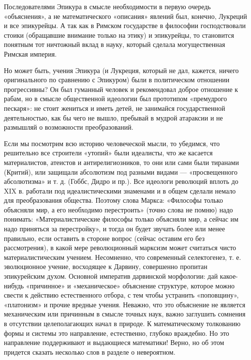 Последователями Эпикура в смысле необходимости в первую очередь «объяснения», а
не математического «описания» явлений был, конечно, Лукреций и все эпикурейцы.
А так как в Римском государстве в философии господствовали стоики (обращавшие
внимание только на этику) и эпикурейцы, то становится понятным тот ничтожный
вклад в науку, который сделала могущественная Римская империя.

Но может быть, учения Эпикура (и Лукреция, который не дал, кажется, ничего
оригинального по сравнению с Эпикуром) были в политическом отношении
прогрессивны? Он был гуманный человек и рекомендовал доброе отношение к рабам,
но в смысле общественной идеологии был прототипом «премудрого пескаря»: не
стоит жениться и иметь детей, не занимайся государственной деятельностью, как
бы чего не вышло, пребывай в мудрой атараксии и не размышляй о возможности
преобразований.

Если мы посмотрим всю историю человеческой мысли, то убедимся, что решительно
все строители «утопий» были идеалисты, что же касается материалистов, атеистов
и антирелигиозников, то они или сами были тиранами (Критий), или защищали
абсолютизм под разными видами --- «просвещенного абсолютизма» и т. д. (Гоббс,
Дидро и пр.). Все идеологи революций вплоть до XIX в. работали под
идеалистическими знаменами и в общем сделали немало для преобразования
общества. Поэтому слова Маркса: «Философы только объясняли мир, а его
необходимо перестроить» (точно слова не помню) надо понимать:
«Материалистические философы только объясняли мир, а сейчас им надо приняться
за перестройку», и тогда он будет звучать более или менее правильно, если
оставить в стороне вопрос (сейчас оставим его без рассмотрения), в какой мере
революционный марксизм может считаться чисто материалистическим учением.
Несомненно, что современный селектогенез, т. е. эволюционное учение, восходящее
к Дарвину, совершенно пропитан эпикурейским духом. Основной императив
дарвинской морфологии: дай какое-нибудь «причинное» и «механическое» объяснение
структуре, которое можно свести к действию естественного отбора, с тем чтобы
устранить «поповщину», «платонизм» и прочие вредные учения. Неважно, что это
объяснение не является механическим или причинным в смысле точных наук, важно
заглушить сомнения
в отсутствии целеполагающих начал в природе. К математическому толкованию формы
и системы это направление, естественно, глубоко враждебно. Но это направление
поддерживают и выдающиеся математики! Верно, но об этом придется сказать
несколько слов в разделе о невероятном.

